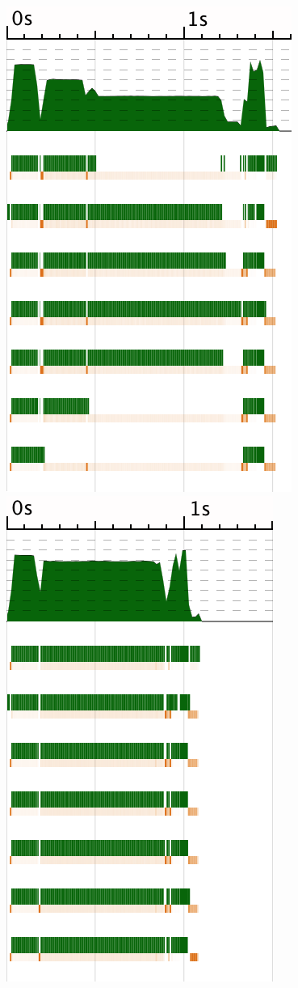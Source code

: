 \begin{figure}
\begin{center}
\includegraphics[scale=0.25]{data/spline/spline3-unbalanced}
\hspace{3em}
\includegraphics[scale=0.25]{data/spline/spline3-interleave}\\

\end{center}
\end{figure}
